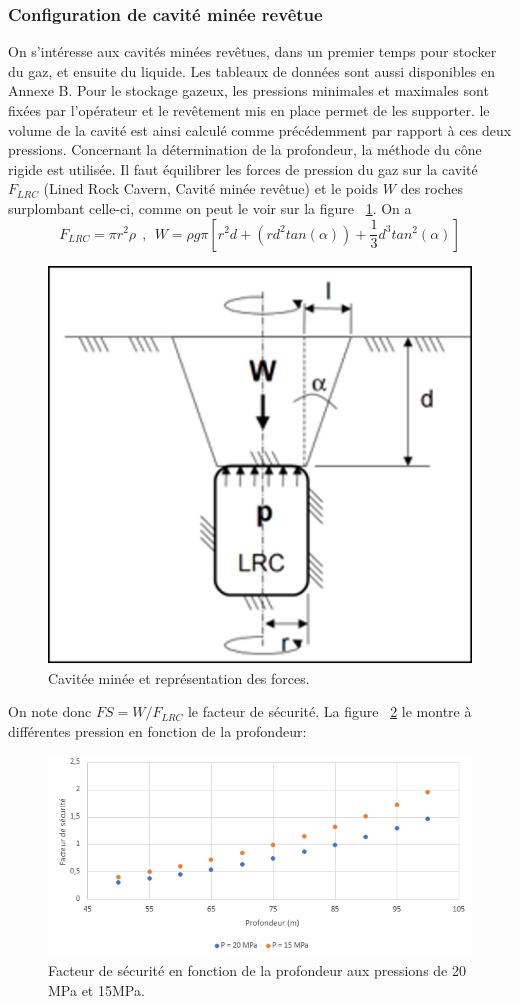 \documentclass[11pt,french,a4paper]{article}
\begin{document}
\subsubsection{Configuration de cavité minée revêtue}
On s'intéresse aux cavités minées revêtues, dans un premier temps pour stocker du gaz, et ensuite du liquide. Les tableaux de données sont aussi disponibles en Annexe B.
Pour le stockage gazeux, les pressions minimales et maximales sont fixées par l'opérateur et le revêtement mis en place permet de les supporter. le volume de la cavité est ainsi calculé comme précédemment par rapport à ces deux pressions. Concernant la détermination de la profondeur, la méthode du cône rigide est utilisée.
Il faut équilibrer les forces de pression du gaz sur la cavité $F_{LRC}$ (Lined Rock Cavern, Cavité minée revêtue) et le poids $W$ des roches surplombant celle-ci, comme on peut le voir sur la figure ~\ref{fig:chap2schemaContrainteMinee}. On a $$F_{LRC}=\pi r^2 \rho \ \ , \ \ W =\rho g \pi [r^2 d + (r d^2 tan(\alpha)) + \frac{1}{3} d^3 tan^2(\alpha)]$$

\begin{figure}[h!]
\centering
\includegraphics[width=0.4\linewidth]{image/chap2/schema_poids_cavite_minee.png}
\caption{Cavitée minée et représentation des forces.}
\label{fig:chap2schemaContrainteMinee}
\end{figure}

On note donc $FS= W/F_{LRC} $ le facteur de sécurité. La figure ~\ref{fig:chap2graphFS} le montre à différentes pression en fonction de la profondeur: 

\begin{figure}[!h]
\centering
\includegraphics[width=.9\linewidth]{image/chap2/courbe_facteurDeSecu.png}
\caption{Facteur de sécurité en fonction de la profondeur aux pressions de 20 MPa et 15MPa.}
\label{fig:chap2graphFS}
\end{figure}
\end{document}
